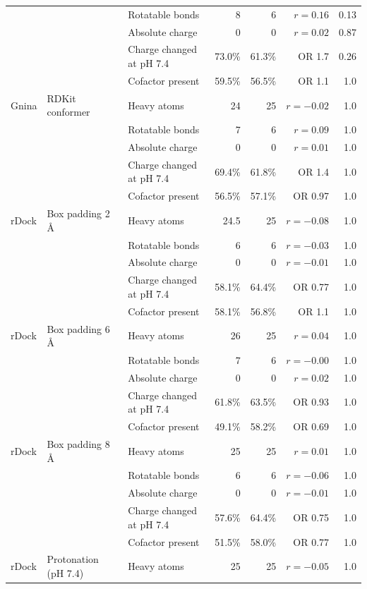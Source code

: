 \begin{longtable}{lllrrrr}
 &  & Rotatable bonds & 8 & 6 & $r = 0.16$ & 0.13 \\
 &  & Absolute charge & 0 & 0 & $r = 0.02$ & 0.87 \\
 &  & Charge changed at pH 7.4 & 73.0\% & 61.3\% & OR 1.7 & 0.26 \\
 &  & Cofactor present & 59.5\% & 56.5\% & OR 1.1 & 1.0 \\
\addlinespace
Gnina & RDKit conformer & Heavy atoms & 24 & 25 & $r = -0.02$ & 1.0 \\
 &  & Rotatable bonds & 7 & 6 & $r = 0.09$ & 1.0 \\
 &  & Absolute charge & 0 & 0 & $r = 0.01$ & 1.0 \\
 &  & Charge changed at pH 7.4 & 69.4\% & 61.8\% & OR 1.4 & 1.0 \\
 &  & Cofactor present & 56.5\% & 57.1\% & OR 0.97 & 1.0 \\
\addlinespace
rDock & Box padding 2 \AA{} & Heavy atoms & 24.5 & 25 & $r = -0.08$ & 1.0 \\
 &  & Rotatable bonds & 6 & 6 & $r = -0.03$ & 1.0 \\
 &  & Absolute charge & 0 & 0 & $r = -0.01$ & 1.0 \\
 &  & Charge changed at pH 7.4 & 58.1\% & 64.4\% & OR 0.77 & 1.0 \\
 &  & Cofactor present & 58.1\% & 56.8\% & OR 1.1 & 1.0 \\
\addlinespace
rDock & Box padding 6 \AA{} & Heavy atoms & 26 & 25 & $r = 0.04$ & 1.0 \\
 &  & Rotatable bonds & 7 & 6 & $r = -0.00$ & 1.0 \\
 &  & Absolute charge & 0 & 0 & $r = 0.02$ & 1.0 \\
 &  & Charge changed at pH 7.4 & 61.8\% & 63.5\% & OR 0.93 & 1.0 \\
 &  & Cofactor present & 49.1\% & 58.2\% & OR 0.69 & 1.0 \\
\addlinespace
rDock & Box padding 8 \AA{} & Heavy atoms & 25 & 25 & $r = 0.01$ & 1.0 \\
 &  & Rotatable bonds & 6 & 6 & $r = -0.06$ & 1.0 \\
 &  & Absolute charge & 0 & 0 & $r = -0.01$ & 1.0 \\
 &  & Charge changed at pH 7.4 & 57.6\% & 64.4\% & OR 0.75 & 1.0 \\
 &  & Cofactor present & 51.5\% & 58.0\% & OR 0.77 & 1.0 \\
\addlinespace
rDock & Protonation (pH 7.4) & Heavy atoms & 25 & 25 & $r = -0.05$ & 1.0 \\

\end{longtable}
